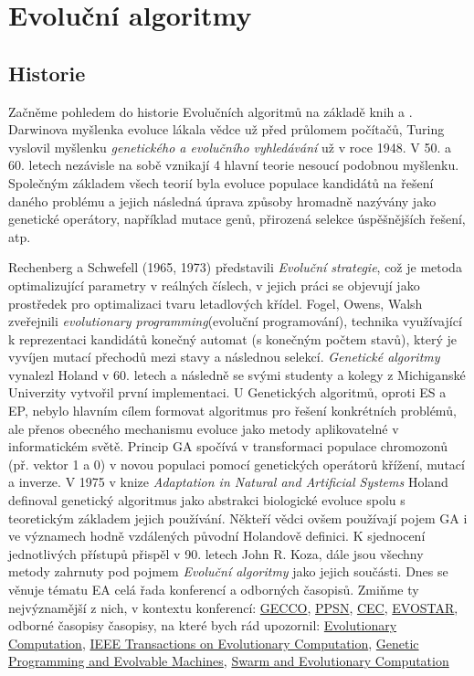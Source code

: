 \chapter{Evoluční algoritmy}
\section{Historie}
Začněme pohledem do historie Evolučních algoritmů na základě knih \cite{MitchellBook} a \cite{eibenIntro}. Darwinova myšlenka evoluce lákala vědce už před průlomem počítačů, Turing vyslovil myšlenku \textit{genetického a evolučního vyhledávání} už v roce 1948. V 50. a 60. letech nezávisle na sobě vznikají 4 hlavní teorie nesoucí podobnou myšlenku. Společným základem všech teorií byla evoluce populace kandidátů na řešení daného problému a jejich následná úprava způsoby hromadně nazývány jako genetické operátory, například mutace genů, přirozená selekce úspěšnějších řešení, atp.
\par 
Rechenberg a Schwefell (1965, 1973) představili \textit{Evoluční strategie}, což je metoda optimalizující parametry v reálných číslech, v jejich práci se objevují jako prostředek pro optimalizaci tvaru letadlových křídel. Fogel, Owens, Walsh zveřejnili \textit{evolutionary programming}(evoluční programování), technika využívající k reprezentaci kandidátů konečný automat (s konečným počtem stavů), který je vyvíjen mutací přechodů mezi stavy a následnou selekcí. \textit{Genetické algoritmy} vynalezl Holand v 60. letech a následně se svými studenty a kolegy z Michiganské Univerzity vytvořil první implementaci. U Genetických algoritmů, oproti ES a EP, nebylo hlavním cílem formovat algoritmus pro řešení konkrétních problémů, ale přenos obecného mechanismu evoluce jako metody aplikovatelné v informatickém světě. Princip GA spočívá v transformaci populace chromozonů (př. vektor 1 a 0) v novou populaci pomocí genetických operátorů křížení, mutací a inverze. V 1975 v knize \textit{Adaptation in Natural and  Artificial Systems} \cite{HolandBook} Holand definoval genetický algoritmus jako abstrakci biologické evoluce spolu s teoretickým základem jejich používání. Někteří vědci ovšem používají pojem GA i ve významech hodně vzdálených původní Holandově definici. K sjednocení jednotlivých přístupů přispěl v 90. letech John R. Koza, dále jsou všechny metody zahrnuty pod pojmem \textit{Evoluční algoritmy} jako jejich součásti. Dnes se věnuje tématu EA celá řada konferencí a odborných časopisů. Zmiňme ty nejvýznamější z nich, v kontextu konferencí: 
\href{http://gecco-2017.sigevo.org/index.html/HomePage}{GECCO}, \href{http://www.ppsn2016.org/conference}{PPSN}, 
\href{http://www.cec2017.org/}{CEC}, 
\href{http://www.evostar.org/2018/}{EVOSTAR}, 
odborné časopisy časopisy, na které bych rád upozornil: 
\href{http://www.mitpressjournals.org/loi/evco}{Evolutionary Computation}, 
\href{http://ieeexplore.ieee.org/xpl/RecentIssue.jsp?reload=true&punumber=4235}{IEEE Transactions on Evolutionary Computation}, 
\href{http://www.springer.com/computer/ai/journal/10710}{Genetic Programming and Evolvable Machines},
\href{https://www.journals.elsevier.com/swarm-and-evolutionary-computation/}{Swarm and Evolutionary Computation}

